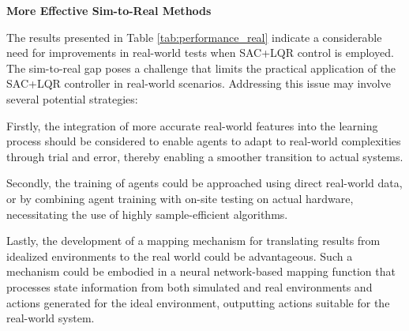 \textbf{More Effective Sim-to-Real Methods}

The results presented in Table \ref{tab:performance_real} indicate a considerable need for improvements in real-world tests when SAC+LQR control is employed. The sim-to-real gap poses a challenge that limits the practical application of the SAC+LQR controller in real-world scenarios. Addressing this issue may involve several potential strategies: 

Firstly, the integration of more accurate real-world features into the learning process should be considered to enable agents to adapt to real-world complexities through trial and error, thereby enabling a smoother transition to actual systems. 

Secondly, the training of agents could be approached using direct real-world data, or by combining agent training with on-site testing on actual hardware, necessitating the use of highly sample-efficient algorithms. 

Lastly, the development of a mapping mechanism for translating results from idealized environments to the real world could be advantageous. Such a mechanism could be embodied in a neural network-based mapping function that processes state information from both simulated and real environments and actions generated for the ideal environment, outputting actions suitable for the real-world system.


\cleardoublepage
